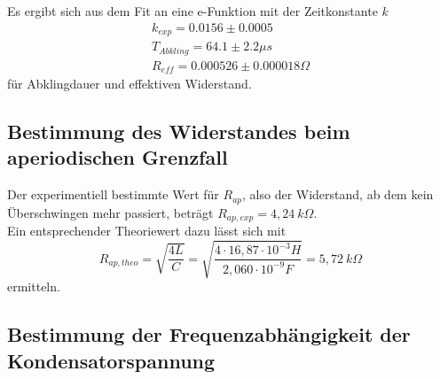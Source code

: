 Es ergibt sich aus dem Fit an eine e-Funktion mit der Zeitkonstante $k$
\begin{align*}
  k_{exp} = 0.0156 \pm 0.0005 \\
  T_{Abkling} = 64.1 \pm 2.2 \mu s \\
  R_{eff} = 0.000526 \pm 0.000018 \Omega 
\end{align*}
für Abklingdauer und effektiven Widerstand.




\subsection{Bestimmung des Widerstandes beim aperiodischen Grenzfall}
\label{R_ap}

Der experimentiell bestimmte Wert für $R_{ap}$, also der Widerstand, ab dem kein Überschwingen mehr passiert, beträgt $R_{ap,exp} = 4,24 \: k\Omega$. \\
Ein entsprechender Theoriewert dazu lässt sich mit 
\begin{equation*}
  R_{ap,theo} = \sqrt{\frac{4L}{C}} = \sqrt{\frac{4 \cdot 16,87 \cdot 10^{-3}H}{2,060 \cdot 10^{-9}F}} = 5,72 \: k\Omega
\end{equation*}
ermitteln.






\subsection{Bestimmung der Frequenzabhängigkeit der Kondensatorspannung}
\label{Kondensatorspannung}

